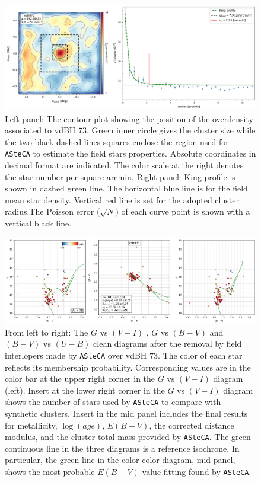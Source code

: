 \documentclass[draft]{aa}
\begin{document}
\begin{figure}[ht]
    \centering
    \includegraphics[width=\hsize]{../figs/dmap_vdbh73.png}
    \caption{Left panel: The contour plot showing the position of the
    overdensity associated to vdBH 73. Green inner circle gives
    the cluster size while the two black dashed lines squares enclose the region
    used for \texttt{ASteCA} to estimate the field stars properties. Absolute
    coordinates in decimal format are indicated. The color scale at the right
    denotes the star number per square arcmin. Right panel: King profile is
    shown in dashed green line. The horizontal blue line is for the field
    mean star density. Vertical red line is set for the adopted cluster
    radius.The Poisson error ($\sqrt{N}$) of each curve point is shown with a
    vertical black line.}
    \label{fig4}
\end{figure}

\begin{figure}[ht]
    \centering
    \includegraphics[width=\hsize]{../figs/cmds_vdbh73.png}
    \caption{From left to right: The $G$ vs $(V-I)$ , $G$ vs $(B-V)$ and
    $(B-V)$ vs $(U-B)$ clean diagrams after the removal by field interlopers
    made by \texttt{ASteCA} over vdBH 73. The color of each star reflects
    its membership probability. Corresponding values are in the color bar at
    the upper right corner in the $G$ vs $(V-I)$ diagram (left). Insert at the
    lower right corner in the $G$ vs $(V-I)$ diagram shows the number of stars
    used by \texttt{ASteCA} to compare with synthetic clusters.
    Insert in the mid panel includes the final
    results for metallicity, $\log(age)$, $E(B-V)$, the corrected distance
    modulus, and the cluster total mass provided by \texttt{ASteCA}. The green
    continuous line in the three diagrams is a reference isochrone. In
    particular, the green line in the color-color diagram, mid panel, shows the
    most probable $E(B-V)$ value fitting found by \texttt{ASteCA}.}
    \label{fig5}
\end{figure}
\end{document}
